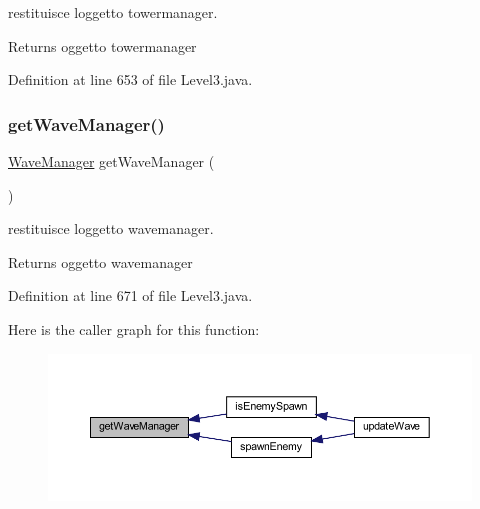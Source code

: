 restituisce l\textquotesingle{}oggetto towermanager. 

\begin{DoxyReturn}{Returns}
oggetto towermanager 
\end{DoxyReturn}


Definition at line 653 of file Level3.\+java.

\mbox{\label{classscenes_1_1_level3_a6b0fc6fbe769f38b9418fbaa51214735}} 
\subsubsection{\texorpdfstring{get\+Wave\+Manager()}{getWaveManager()}}
{\footnotesize\ttfamily \hyperlink{classmanagers_1_1_wave_manager}{Wave\+Manager} get\+Wave\+Manager (\begin{DoxyParamCaption}{ }\end{DoxyParamCaption})}



restituisce l\textquotesingle{}oggetto wavemanager. 

\begin{DoxyReturn}{Returns}
oggetto wavemanager 
\end{DoxyReturn}


Definition at line 671 of file Level3.\+java.

Here is the caller graph for this function\+:\nopagebreak
\begin{figure}[H]
\begin{center}
\leavevmode
\includegraphics[width=350pt]{classscenes_1_1_level3_a6b0fc6fbe769f38b9418fbaa51214735_icgraph}
\end{center}
\end{figure}
\mbox{\label{classscenes_1_1_level3_aded9c531b53772fd90d09a8b6bf0132e}} 
